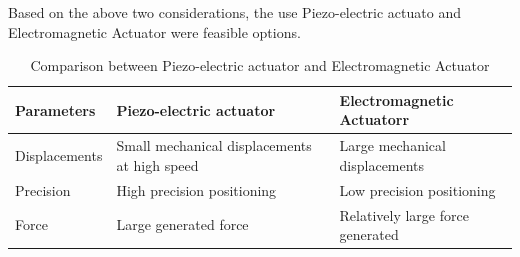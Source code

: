 Based on the above two considerations, the use Piezo-electric actuato and Electromagnetic Actuator were feasible options. 
\begin{table}[H]
    \centering
      \caption[Piezo-electric actuator versus Electromagnetic Actuator]{Comparison between Piezo-electric actuator and Electromagnetic Actuator \cite{xla3} \cite{la_t8}}
    \begin{tabular}{|m{3cm}|m{5cm}|m{5cm}|}
    \hline
Parameters & Piezo-electric actuator & Electromagnetic Actuatorr \\ \hline 
Displacements & Small mechanical displacements at high speed & Large mechanical displacements \\ \hline
Precision&High precision positioning & Low precision positioning\\ \hline
Force & Large generated force & Relatively large force generated\\ \hline
    \end{tabular}
\end{table}
